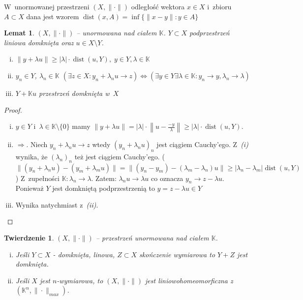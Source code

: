 \documentclass[10pt]{article}
\renewcommand{\[}{\begin{equation}}
\renewcommand{\]}{\end{equation}}
\newcommand{\K}{\ensuremath{\mathbb{K}}}
\newcommand{\dist}{\operatorname{dist}}
\newtheorem{twr}[subsubsection]{Twierdzenie}%
\newtheorem{lem}[subsubsection]{Lemat}
\newcounter{numer}
\begin{document}
W~unormowanej przestrzeni $(X,\|\cdot\|)$ odległość wektora $x\in X$ i~zbioru $A\subset X$ dana jest wzorem $\dist(x,A) = \inf \{\|x-y\|: y \in A\}$
\begin{lem}
  \label{lem1}
	$(X,\|\cdot\|)$ -- unormowana nad ciałem $\K$. $Y\subset X$ podprzestrzeń liniowa domknięta oraz $u\in X\setminus Y$. 
	\begin{enumerate}[(i)]
		\item $\|y+\lambda u \| \ge |\lambda| \cdot \dist(u,Y), \; y\in Y, \lambda \in \K$
		\item $y_n \in Y$, $\lambda_n \in \K$ 
			$\left(\exists z \in X: y_n + \lambda_n u \to z \right) \Leftrightarrow 
			\left( \exists y\in Y \exists \lambda \in \K: y_n \to y, \lambda_n \to \lambda  \right)$
		\item $Y+\K u$ przestrzeń domknięta w~$X$
	\end{enumerate}

\end{lem}
\begin{proof}
	\begin{enumerate}[(i)]
	  \item $y\in Y$ i~$\lambda \in \K\setminus \{0\}$ mamy $\|y+\lambda u\|= |\lambda|\cdot \left\| u - \frac{-y}{\lambda}\right\|\ge |\lambda| \cdot \dist(u,Y)$.
		\item $\Rightarrow$. Niech $y_n + \lambda_n u \to z$ wtedy  $(y_n + \lambda_n u )_n $ jest ciągiem Cauchy'ego. 
			Z~\textit{(i)} wynika, że $(\lambda_n)_n$ też jest ciągiem Cauchy'ego.
			($\|(y_n +\lambda_n u ) - (y_m +\lambda_m u)\| = \|(y_n-y_m) - (\lambda_m-\lambda_n)u\| \ge |\lambda_n-\lambda_m| \dist(u,Y)$)
			Z~zupełności $\K: \lambda_n \to \lambda$.
			Zatem: $\lambda_n u \to \lambda u$ co oznacza $y_n \to z - \lambda u$. Ponieważ $Y$ jest domkniętą podprzestrzenią to $y = z - \lambda u \in Y$
		\item Wynika natychmiast z~\textit{(ii)}. 
	\end{enumerate}
\end{proof}
\begin{twr}
	$(X,\|\cdot\|)$ -- przestrzeń unormowana nad ciałem $\K$.
	\begin{enumerate}[(i)]
		\item Jeśli $Y\subset X$ - domknięta, linowa, $Z\subset X$ skończenie wymiarowa to $Y+ Z$ jest domknięta.
		\item Jeśli $X$ jest $n$-wymiarowa, to $(X,\|\cdot\|)$ jest liniowo\dywiz homeomorficzna z~$(\K^n, \|\cdot\|_{max})$.
			
	\end{enumerate}
\end{twr}
\end{document}
